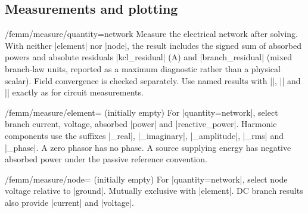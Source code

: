 \subsection{Measurements and plotting}
\begin{key}{/femm/measure/quantity=network}
Measure the electrical network after solving. With neither |element| nor |node|,
the result includes the signed sum of absorbed powers and absolute residuals
|kcl_residual| (A) and |branch_residual| (mixed branch-law units, reported as a
maximum diagnostic rather than a physical scalar). Field convergence is checked
separately. Use named results with |\femmvalue|, |\femmresult| and
|\femmresultplot| exactly as for circuit measurements.
\end{key}
\begin{key}{/femm/measure/element= (initially empty)}
For |quantity=network|, select branch current, voltage, absorbed |power| and
|reactive_power|. Harmonic components use the suffixes |_real|, |_imaginary|,
|_amplitude|, |_rms| and |_phase|. A zero phasor has no phase. A source supplying
energy has negative absorbed power under the passive reference convention.
\end{key}
\begin{key}{/femm/measure/node= (initially empty)}
For |quantity=network|, select node voltage relative to |ground|. Mutually
exclusive with |element|. DC branch results also provide |current| and |voltage|.
\end{key}

